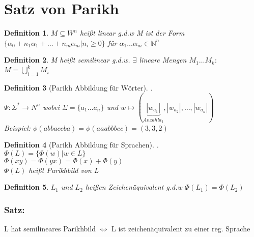     \section{Satz von Parikh}
    \newtheorem{def1}{Definition}[section]
	  \begin{def1}
	  	$M\subseteq W^n$ heißt linear g.d.w M ist der Form \\ $\{\alpha_0+n_1\alpha_1+\dots+n_m\alpha_m|n_i\geq0\}$ für $\alpha_1 \dots \alpha_m \in \mathds{N}^n$
	  \end{def1}
	  \begin{def1}
	  	M heißt semilinear g.d.w.
	  	$\exists$ lineare Mengen $M_1\dots M_k:$\\
	  	$M=\bigcup\limits_{i=1}^kM_i$
	  \end{def1}
	  \begin{def1}[Parikh Abbildung für Wörter] .\\
	  	$\Psi: \Sigma^*\rightarrow N^n$ wobei  $\Sigma=\{a_1\dots a_n\}$ und $w\mapsto (\underbrace{|w_{a_1}|}_{Anzahl a_1} ,|w_{a_2}|,\dots, |w_{a_n}|)$\\
	  	  Beispiel: $\phi(abbaccba)=\phi(aaabbbcc)=(3,3,2)$\\
	  \end{def1}
	\begin{def1}[Parikh Abbildung für Sprachen].\\
		$\Phi(L)=\{\Phi(w)|w\in L\}$\\
		$\Phi(xy)=\Phi(yx)=\Phi(x)+\Phi(y)$\\
		$\Phi(L)$ heißt Parikhbild von L
	\end{def1}
	\begin{def1}
		$L_1$ und $L_2$ heißen Zeichenäquivalent g.d.w $\Phi(L_1)=\Phi(L_2)$\\
	\end{def1}
	\subsubsection{Satz:}
	L hat semilineares Parikhbild $\Longleftrightarrow$ L ist zeichenäquivalent zu einer reg. Sprache
